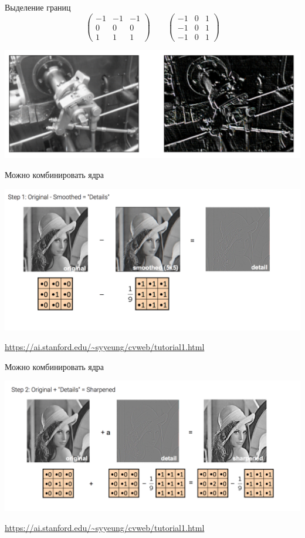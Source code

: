 \documentclass[notes,12pt, aspectratio=169]{beamer}
\begin{document}
\begin{frame}{Выделение границ} 
\[ 
\begin{pmatrix}
-1 & -1 & -1  \\
0 & 0 & 0 \\         
1 & 1 & 1 
\end{pmatrix}  \qquad 
\begin{pmatrix}
-1 & 0 & 1  \\
-1 & 0 & 1 \\         
-1 & 0 & 1 
\end{pmatrix} 
\]

\begin{center}
	\includegraphics[width=.7\linewidth]{cconv_3.png}
\end{center}
\end{frame}


\begin{frame}{Можно комбинировать ядра} 
\begin{center}
	\includegraphics[width=.9\linewidth]{lena_lena_1.png}
\end{center}

\vfill %
\footnotesize
{\color{blue} \url{https://ai.stanford.edu/~syyeung/cvweb/tutorial1.html}}
\end{frame}


\begin{frame}{Можно комбинировать ядра} 
\begin{center}
	\includegraphics[width=.9\linewidth]{lena_lena_2.png}
\end{center}

\vfill %
\footnotesize
{\color{blue} \url{https://ai.stanford.edu/~syyeung/cvweb/tutorial1.html}}
\end{frame}
\end{document}
